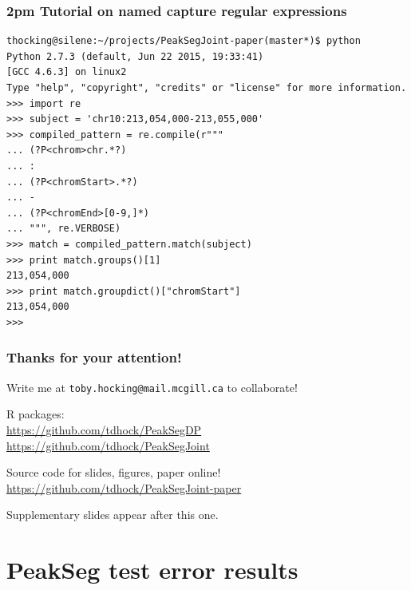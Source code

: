 \documentclass{beamer}
\begin{document}
\begin{frame}[fragile]
  \frametitle{2pm Tutorial on named capture regular expressions}
\small
\begin{verbatim}
thocking@silene:~/projects/PeakSegJoint-paper(master*)$ python
Python 2.7.3 (default, Jun 22 2015, 19:33:41) 
[GCC 4.6.3] on linux2
Type "help", "copyright", "credits" or "license" for more information.
>>> import re
>>> subject = 'chr10:213,054,000-213,055,000'
>>> compiled_pattern = re.compile(r"""
... (?P<chrom>chr.*?)
... :
... (?P<chromStart>.*?)
... -
... (?P<chromEnd>[0-9,]*)
... """, re.VERBOSE)
>>> match = compiled_pattern.match(subject)
>>> print match.groups()[1]
213,054,000
>>> print match.groupdict()["chromStart"]
213,054,000
>>> 
\end{verbatim}
\end{frame}

\begin{frame}
  \frametitle{Thanks for your attention!}
  Write me at \alert{\texttt{toby.hocking@mail.mcgill.ca}} to collaborate!

  \vskip 1cm

  R packages:\\
  \url{https://github.com/tdhock/PeakSegDP}\\
  \url{https://github.com/tdhock/PeakSegJoint}

  \vskip 1cm

  Source code for slides, figures, paper online!\\
  \small
  \url{https://github.com/tdhock/PeakSegJoint-paper}
  \vskip 1cm

  Supplementary slides appear after this one.

\end{frame}

\section*{PeakSeg test error results}
\end{document}
